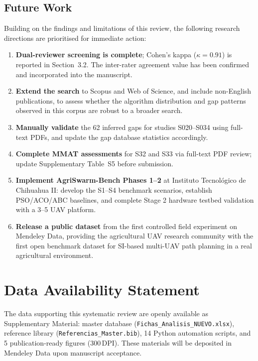 \documentclass[review,3p,times]{elsarticle}
\begin{document}
\subsection{Future Work}

Building on the findings and limitations of this review, the following research directions are prioritised for immediate action:

\begin{enumerate}
  \item \textbf{Dual-reviewer screening is complete}; Cohen's kappa ($\kappa=0.91$) is reported in Section~3.2. The inter-rater agreement value has been confirmed and incorporated into the manuscript.
  \item \textbf{Extend the search} to Scopus and Web of Science, and include non-English publications, to assess whether the algorithm distribution and gap patterns observed in this corpus are robust to a broader search.
  \item \textbf{Manually validate} the 62 inferred gaps for studies S020--S034 using full-text PDFs, and update the gap database statistics accordingly.
  \item \textbf{Complete MMAT assessments} for S32 and S33 via full-text PDF review; update Supplementary Table~S5 before submission.
  \item \textbf{Implement AgriSwarm-Bench Phases 1--2} at Instituto Tecnológico de Chihuahua II: develop the S1--S4 benchmark scenarios, establish PSO/ACO/ABC baselines, and complete Stage 2 hardware testbed validation with a 3--5 UAV platform.
  \item \textbf{Release a public dataset} from the first controlled field experiment on Mendeley Data, providing the agricultural UAV research community with the first open benchmark dataset for SI-based multi-UAV path planning in a real agricultural environment.
\end{enumerate}



\section*{Data Availability Statement}
The data supporting this systematic review are openly available as Supplementary Material: master database (\texttt{Fichas\_Analisis\_NUEVO.xlsx}), reference library (\texttt{Referencias\_Master.bib}), 14 Python automation scripts, and 5 publication-ready figures (300\,DPI). These materials will be deposited in Mendeley Data upon manuscript acceptance.
\end{document}
